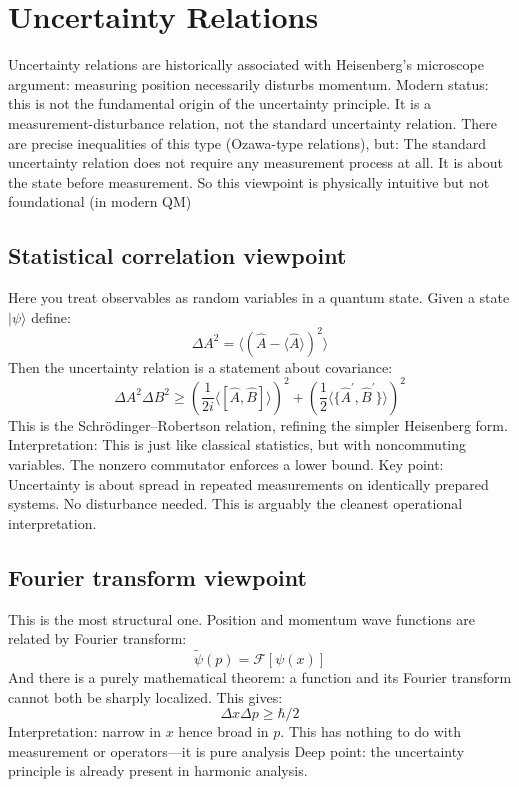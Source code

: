 \section{Uncertainty Relations}
\label{cq:ur}

 Uncertainty relations are historically associated with Heisenberg’s microscope
 argument: measuring position necessarily disturbs momentum.
Modern status: this is not the fundamental origin of the uncertainty principle.
It is a measurement-disturbance relation, not the standard uncertainty relation.
There are precise inequalities of this type (Ozawa-type relations), but:
The standard uncertainty relation does not require any measurement process at all.
It is about the state before measurement.
So this viewpoint is physically intuitive but not foundational (in modern QM)

\subsection{ Statistical correlation viewpoint}
Here you treat observables as random variables in a quantum state.
Given a state $ |{\psi}\rangle $ define:
\[ \Delta A^2=\langle(\hat A - \langle \hat A \rangle)^2 \rangle \]
Then the uncertainty relation is a statement about covariance:
\[ \Delta A^2 \Delta B^2 \ge 
(\frac{1}{2 i} \langle [\hat A,\hat B] \rangle)^2
+(\frac{1}{2} \langle \{\hat {A}^{'},
\hat {B}^{'}\} \rangle)^2
\]
This is the Schrödinger–Robertson relation, refining the simpler Heisenberg form.
Interpretation:
This is just like classical statistics, but with noncommuting variables.
The nonzero commutator enforces a lower bound.
Key point:
Uncertainty is about spread in repeated measurements on identically prepared systems.
No disturbance needed.
This is arguably the cleanest operational interpretation.

\subsection{ Fourier transform viewpoint}
This is the most structural one.
Position and momentum wave functions are related by Fourier transform:
\[ \tilde \psi (p)=\mathcal{F}[\psi(x)] \]
And there is a purely mathematical theorem:
a function and its Fourier transform cannot both be sharply localized.
This gives:
\[ \Delta x \Delta p \ge \hbar/2 \]
Interpretation: narrow in $ x $ hence broad in $ p $.
This has nothing to do with measurement or operators—it is pure analysis
Deep point:
the uncertainty principle is already present in harmonic analysis.

